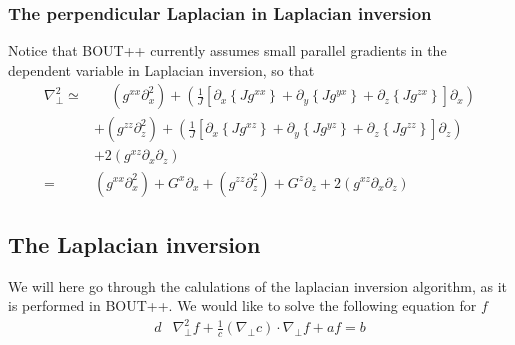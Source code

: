 \documentclass[12pt]{article}
\def\L{\left}
\def\R{\right}
\newcommand{\Grad}{\ensuremath{\nabla}}
\begin{document}
\subsubsection{The perpendicular Laplacian in Laplacian inversion}
%
Notice that BOUT++ currently assumes small parallel gradients in the dependent
variable in Laplacian inversion, so that
%
\begin{align*}
    \Grad_\perp^2 \simeq& \quad \,
               \L(g^{xx} \partial_x^2\R)
               + \L(
                    \frac{1}{J} \L[
                      \partial_x \L\{J g^{xx} \R\}
                    + \partial_y \L\{J g^{yx} \R\}
                    + \partial_z \L\{J g^{zx} \R\}
                    \R]
                    \partial_x\R)\\
            &+ \L(g^{zz} \partial_z^2\R)
               + \L(
                    \frac{1}{J} \L[
                      \partial_x \L\{J g^{xz} \R\}
                    + \partial_y \L\{J g^{yz} \R\}
                    + \partial_z \L\{J g^{zz} \R\}
                    \R]
                    \partial_z\R)\\
            &+ 2\L(g^{xz} \partial_x \partial_z\R)\\
%
%
           =&
               \L(g^{xx} \partial_x^2\R)
               +
                    G^x\partial_x
            + \L(g^{zz} \partial_z^2\R)
               + G^z \partial_z
            + 2\L(g^{xz} \partial_x \partial_z\R)
\end{align*}
%



\subsection{The Laplacian inversion}
%
We will here go through the calulations of the laplacian inversion algorithm,
as it is performed in BOUT++. We would like to solve the following equation
for $f$
%
\begin{align}
    d&\Grad_\perp^2f + \frac{1}{c}(\Grad_\perp c)\cdot\Grad_\perp f + af = b
    \label{eq:to_invert}
\end{align}
%
\end{document}
